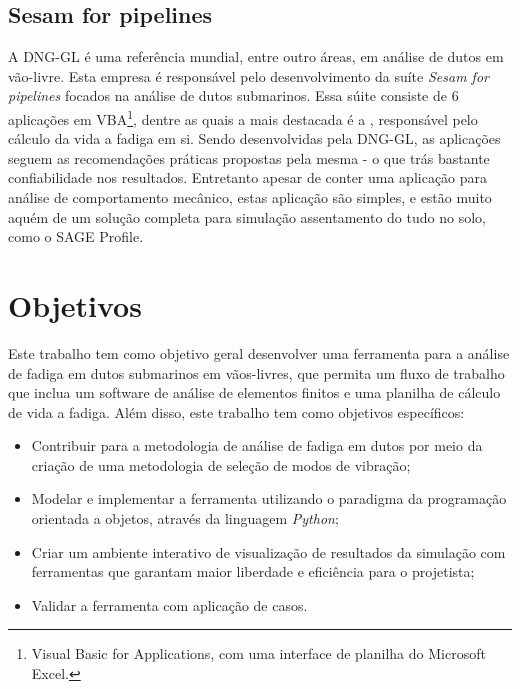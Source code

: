 \subsection{Sesam for pipelines}

A DNG-GL é uma referência mundial, entre outro áreas, em análise de dutos em vão-livre. Esta empresa é responsável pelo desenvolvimento da suíte \textit{Sesam for pipelines}
focados na análise de dutos submarinos.
Essa súite consiste de 6 aplicações em VBA\footnote{Visual Basic for Applications, com uma interface de planilha do Microsoft Excel.}, dentre as quais a mais destacada é a \fatfree, responsável pelo cálculo da vida a fadiga em si. Sendo desenvolvidas pela DNG-GL, as aplicações seguem as recomendações práticas propostas pela mesma - o que trás bastante confiabilidade nos resultados. Entretanto apesar de conter uma aplicação para análise de comportamento mecânico, estas aplicação são simples, e estão muito aquém de um solução completa para simulação assentamento do tudo no solo, como o SAGE Profile.


% 


\section{Objetivos}

Este trabalho tem como objetivo geral desenvolver uma ferramenta para a análise de fadiga em dutos submarinos em vãos-livres, que permita um fluxo de trabalho que inclua um software de análise de elementos finitos e uma planilha de cálculo de vida a fadiga.
Além disso, este trabalho tem como objetivos específicos:

\begin{itemize}
    \item Contribuir para a metodologia de análise de fadiga em dutos por meio da criação de uma metodologia de seleção de modos de vibração;
    \item Modelar e implementar a ferramenta utilizando o paradigma da programação orientada a objetos, através da linguagem \textit{Python};
    \item Criar um ambiente interativo de visualização de resultados da simulação com ferramentas que garantam maior liberdade e eficiência para o projetista;
    \item Validar a ferramenta com aplicação de casos.
\end{itemize}

% 